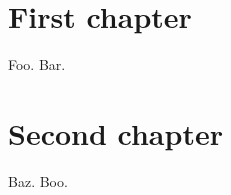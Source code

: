 \documentclass{book}
\begin{document}
\chapter{First chapter}
Foo.
Bar.
\printpostnotes
\chapter{Second chapter}
\setcounter{postnote}{0}
Baz.
Boo.
\printpostnotes
\end{document}
